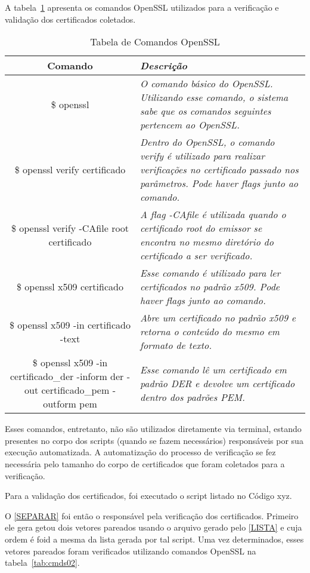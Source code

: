		A tabela~\ref{tab:cmds01} apresenta os comandos OpenSSL utilizados para a verificação e validação dos certificados coletados.

		\begin{table}[h]
			\centering
			\caption{Tabela de Comandos OpenSSL}
			\label{tab:cmds01}
			\begin{tabular}{c>{\em}l}
			\toprule
			\textbf{Comando} & \textbf{Descrição} \\ \midrule
			\$ openssl & O comando básico do OpenSSL. Utilizando esse comando, o sistema sabe que os comandos seguintes pertencem ao OpenSSL. \\ 
			\rowcolor[gray]{0.9}
			\$ openssl verify certificado & Dentro do OpenSSL, o comando verify é utilizado para realizar verificações no certificado passado nos parâmetros. Pode haver flags junto ao comando. \\
			\$ openssl verify -CAfile root certificado & A flag -CAfile é utilizada quando o certificado root do emissor se encontra no mesmo diretório do certificado a ser verificado. \\
			\rowcolor[gray]{0.9}
			\$ openssl x509 certificado & Esse comando é utilizado para ler certificados no padrão x509. Pode haver flags junto ao comando. \\
			\$ openssl x509 -in certificado -text & Abre um certificado no padrão x509 e retorna o conteúdo do mesmo em formato de texto. \\
			\rowcolor[gray]{0.9}
			\$ openssl x509 -in certificado\_der -inform der -out certificado\_pem -outform pem & Esse comando lê um certificado em padrão DER e devolve um certificado dentro dos padrões PEM. \\
			\bottomrule
			\end{tabular}
		\end{table}
		Esses comandos, entretanto, não são utilizados diretamente via terminal, estando presentes no corpo dos scripts (quando se fazem necessários) responsáveis por sua execução automatizada. A automatização do processo de verificação se fez necessária pelo tamanho do corpo de certificados que foram coletados para a verificação.

	    Para a validação dos certificados, foi executado o script listado no Código xyz.

	    
	    O \ref{SEPARAR} foi então o responsável pela verificação dos certificados. Primeiro ele gera  getou dois vetores pareados usando o arquivo gerado pelo \ref{LISTA} e cuja ordem é  foid a mesma da lista gerada por tal script. Uma vez determinados, esses vetores pareados foram verificados utilizando comandos OpenSSL na tabela~\ref{tab:cmds02}.

